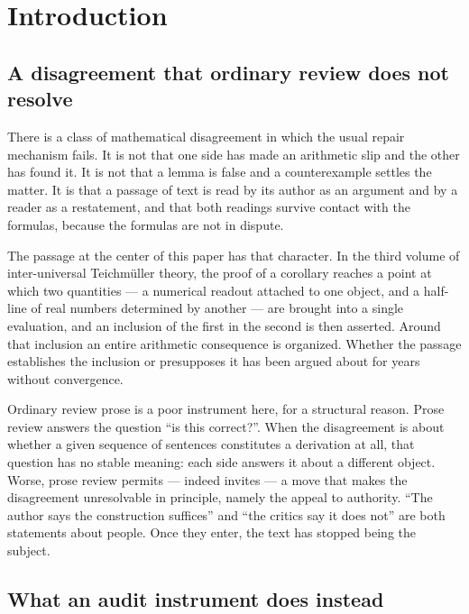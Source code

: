 \documentclass[11pt,a4paper]{article}
\theoremstyle{definition}
\begin{document}
\clearpage

\section{Introduction}
\label{sec:intro}

\subsection{A disagreement that ordinary review does not resolve}

There is a class of mathematical disagreement in which the usual repair mechanism
fails. It is not that one side has made an arithmetic slip and the other has
found it. It is not that a lemma is false and a counterexample settles the
matter. It is that a passage of text is read by its author as an argument and by
a reader as a restatement, and that both readings survive contact with the
formulas, because the formulas are not in dispute.

The passage at the center of this paper has that character. In the third volume
of inter-universal Teichmüller theory, the proof of a corollary reaches a point
at which two quantities --- a numerical readout attached to one object, and a
half-line of real numbers determined by another --- are brought into a single
evaluation, and an inclusion of the first in the second is then asserted. Around
that inclusion an entire arithmetic consequence is organized. Whether the passage
establishes the inclusion or presupposes it has been argued about for years
without convergence.

Ordinary review prose is a poor instrument here, for a structural reason. Prose
review answers the question ``is this correct?''. When the disagreement is about
whether a given sequence of sentences constitutes a derivation at all, that
question has no stable meaning: each side answers it about a different object.
Worse, prose review permits --- indeed invites --- a move that makes the
disagreement unresolvable in principle, namely the appeal to authority. ``The
author says the construction suffices'' and ``the critics say it does not'' are
both statements about people. Once they enter, the text has stopped being the
subject.

\subsection{What an audit instrument does instead}
\end{document}
